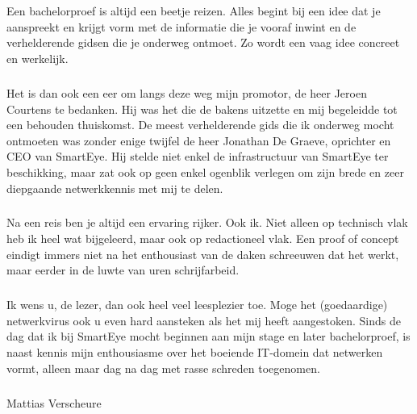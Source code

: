 
\chapter*{}%
\label{ch:voorwoord}
\paragraph{}
Een bachelorproef is altijd een beetje reizen. Alles begint bij een idee dat je aanspreekt en krijgt vorm met de informatie die je vooraf inwint en de verhelderende gidsen die je onderweg ontmoet. Zo wordt een vaag idee concreet en werkelijk.
\paragraph{}
Het is dan ook een eer om langs deze weg mijn promotor, de heer Jeroen Courtens te bedanken. Hij was het die de bakens uitzette en mij begeleidde tot een behouden thuiskomst.
De meest verhelderende gids die ik onderweg mocht ontmoeten was zonder enige twijfel de heer Jonathan De Graeve, oprichter en CEO van SmartEye. Hij stelde niet enkel de infrastructuur van SmartEye ter beschikking, maar zat ook op geen enkel ogenblik verlegen om zijn brede en zeer diepgaande netwerkkennis met mij te delen.
\paragraph{}
Na een reis ben je altijd een ervaring rijker. Ook ik. Niet alleen op technisch vlak heb ik heel wat bijgeleerd, maar ook op redactioneel vlak. Een proof of concept eindigt immers niet na het enthousiast van de daken schreeuwen dat het werkt, maar eerder in de luwte van uren schrijfarbeid.
\paragraph{}
Ik wens u, de lezer, dan ook heel veel leesplezier toe. Moge het (goedaardige) netwerkvirus ook u even hard aansteken als het mij heeft aangestoken. Sinds de dag dat ik bij SmartEye mocht beginnen aan mijn stage en later bachelorproef, is naast kennis mijn enthousiasme over het boeiende IT-domein dat netwerken vormt, alleen maar dag na dag met rasse schreden toegenomen.
\paragraph{}
Mattias Verscheure
